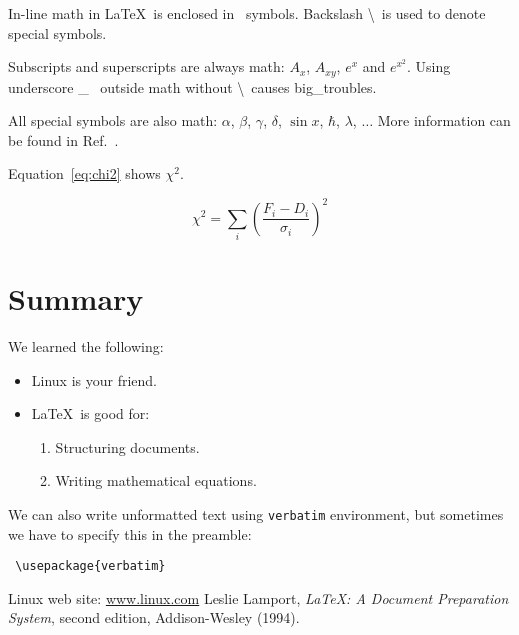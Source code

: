 \documentclass[a4paper,10pt,twoside]{article}
\begin{document}
In-line math in \LaTeX \ is enclosed in \ symbols. Backslash \textbackslash \ is used to denote special symbols.

Subscripts and superscripts are always math: $A_x$, $A_{xy}$,
$e^x$ and $e^{x^2}$. Using underscore \_ \ outside math without \textbackslash \ causes big\_troubles.

All special symbols are also math: $\alpha$, $\beta$, $\gamma$, $\delta$, $\sin x$, $\hbar$, $\lambda$, $\ldots$ More information can be found in Ref.~\cite{latex}.

Equation~\ref{eq:chi2} shows $\chi^2$.

\begin{equation}
 \label{eq:chi2}
 \chi^2 = \sum\limits_i \left(\frac{F_i - D_i}{\sigma_i}\right)^2
\end{equation}


\section{Summary}
\label{sec:sum}

We learned the following:
\begin{itemize}
 \item Linux is your friend.
 \item \LaTeX \ is good for:
	\begin{enumerate}
	 \item Structuring documents.
	 \item Writing mathematical equations.
	\end{enumerate}
\end{itemize}

We can also write unformatted text using \texttt{verbatim} environment, but sometimes we have to specify this in the preamble:
\begin{verbatim}
 \usepackage{verbatim}
\end{verbatim}

 
\begin{thebibliography}{99}
  Linux web site: \url{www.linux.com}
  Leslie Lamport, \textsl{LaTeX: A Document Preparation System}, second edition, Addison-Wesley (1994). 
\end{thebibliography}

 
\end{document}
